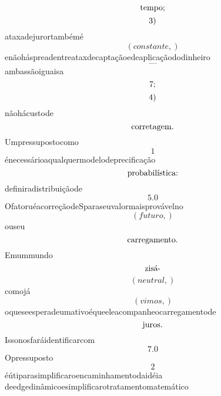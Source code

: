 \documentclass{article}
\begin{document}
\begin{equation}
$tempo;$
\end{equation}\begin{equation}
$3)$
\end{equation}ataxadejurortambémé\begin{equation}
\left( constante,\right)
\end{equation}enãoháspreadentreataxdecaptaçãoedeaplicaçãododinheiro\begin{equation}
—
\end{equation}ambassãoiguaisa\begin{equation}
$7;$
\end{equation}\begin{equation}
$4)$
\end{equation}nãohácustode\begin{equation}
$corretagem.$
\end{equation}Umpressupostocomo\begin{equation}
1
\end{equation}énecessárioaqualquermodelodeprecificação\begin{equation}
$probabilística:$
\end{equation}definiradistribuiçãode\begin{equation}
5.0
\end{equation}OfatoruéacorreçãodeSparaseuvalormaisprovávelno\begin{equation}
\left( futuro,\right)
\end{equation}ouseu\begin{equation}
$carregamento.$
\end{equation}Emummundo\begin{equation}
$zisá-$
\end{equation}\begin{equation}
\left( neutral,\right)
\end{equation}comojá\begin{equation}
\left( vimos,\right)
\end{equation}oqueseesperadeumativoéqueeleacompanheocarregamentode\begin{equation}
$juros.$
\end{equation}Issonosfaráidentificarcom\begin{equation}
7.0
\end{equation}Opressuposto\begin{equation}
2
\end{equation}éútiparasimplificaroencaminhamentodaidéia deedgedinâmicoesimplificarotratamentomatemático\begin{equation}

\end{equation}
\end{document}
